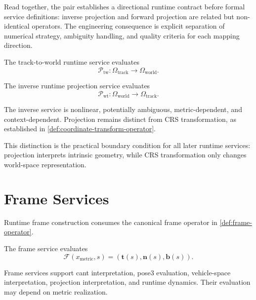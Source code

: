 Read together, the pair establishes a directional runtime contract
before formal service definitions: inverse projection and forward
projection are related but non-identical operators. The engineering
consequence is explicit separation of numerical strategy, ambiguity
handling, and quality criteria for each mapping direction.

\begin{definition}
\label{def:track-to-world-runtime}
The track-to-world runtime service evaluates
\[
\mathcal P_{\mathrm{tw}}
:
\Omega_{\mathrm{track}}
\rightarrow
\Omega_{\mathrm{world}}.
\]
\end{definition}

\begin{definition}
\label{def:world-to-track-runtime}
The inverse runtime projection service evaluates
\[
\mathcal P_{\mathrm{wt}}
:
\Omega_{\mathrm{world}}
\rightarrow
\Omega_{\mathrm{track}}.
\]
\end{definition}

The inverse service is nonlinear, potentially ambiguous,
metric-dependent, and context-dependent. Projection remains distinct
from CRS transformation, as established in
\cref{def:coordinate-transform-operator}.

This distinction is the practical boundary condition for all later
runtime services: projection interprets intrinsic geometry, while CRS
transformation only changes world-space representation.

\section{Frame Services}

Runtime frame construction consumes the canonical frame operator in
\cref{def:frame-operator}.

\begin{definition}
\label{def:frame-service}
The frame service evaluates
\[
\mathcal F(x_{\mathrm{metric}},s)
=
(\mathbf t(s),\mathbf n(s),\mathbf b(s)).
\]
\end{definition}

Frame services support cant interpretation, pose3 evaluation,
vehicle-space interpretation, projection interpretation, and runtime
dynamics. Their evaluation may depend on metric realization.

